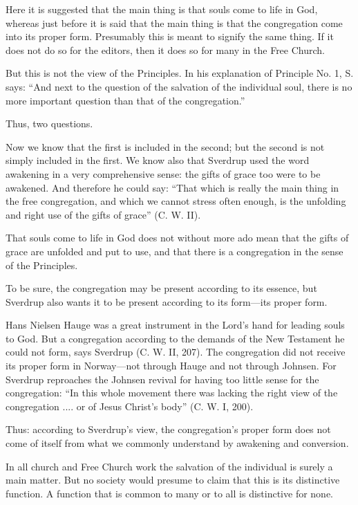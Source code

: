 Here it is suggested that the main thing is that souls come to life in God, whereas just before it is said that the main thing is that the congregation come into its proper form. Presumably this is meant to signify the same thing. If it does not do so for the editors, then it does so for many in the Free Church.

But this is not the view of the Principles. In his explanation of Principle No. 1, S. says: “And next to the question of the salvation of the individual soul, there is no more important question than that of the congregation.”

Thus, two questions.

Now we know that the first is included in the second; but the second is not simply included in the first. We know also that Sverdrup used the word awakening in a very comprehensive sense: the gifts of grace too were to be awakened. And therefore he could say: “That which is really the main thing in the free congregation, and which we cannot stress often enough, is the unfolding and right use of the gifts of grace” (C. W. II).

That souls come to life in God does not without more ado mean that the gifts of grace are unfolded and put to use, and that there is a congregation in the sense of the Principles.

To be sure, the congregation may be present according to its essence, but Sverdrup also wants it to be present according to its form—its proper form.

Hans Nielsen Hauge was a great instrument in the Lord’s hand for leading souls to God. But a congregation according to the demands of the New Testament he could not form, says Sverdrup (C. W. II, 207). The congregation did not receive its proper form in Norway—not through Hauge and not through Johnsen. For Sverdrup reproaches the Johnsen revival for having too little sense for the congregation: “In this whole movement there was lacking the right view of the congregation .... or of Jesus Christ’s body” (C. W. I, 200).

Thus: according to Sverdrup’s view, the congregation’s proper form does not come of itself from what we commonly understand by awakening and conversion.

In all church and Free Church work the salvation of the individual is surely a main matter. But no society would presume to claim that this is its distinctive function. A function that is common to many or to all is distinctive for none.

